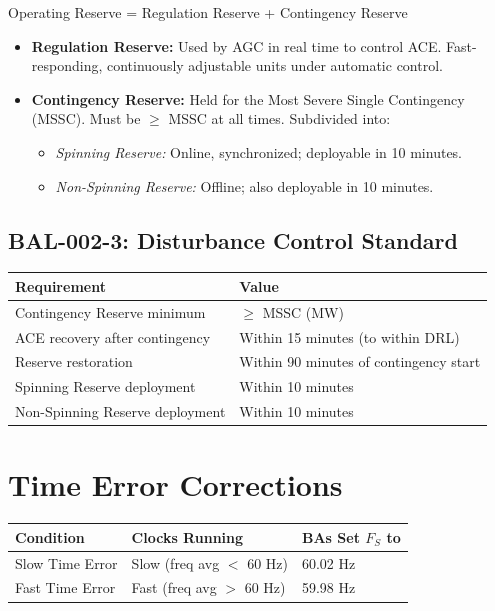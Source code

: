 \documentclass[12pt,twoside,openright]{memoir}
\begin{document}
Operating Reserve = Regulation Reserve + Contingency Reserve

\begin{itemize}
  \item \textbf{Regulation Reserve:} Used by AGC in real time to control ACE. Fast-responding,
        continuously adjustable units under automatic control.
  \item \textbf{Contingency Reserve:} Held for the Most Severe Single Contingency (MSSC).
        Must be $\geq$ MSSC at all times. Subdivided into:
        \begin{itemize}
          \item \textit{Spinning Reserve:} Online, synchronized; deployable in 10 minutes.
          \item \textit{Non-Spinning Reserve:} Offline; also deployable in 10 minutes.
        \end{itemize}
\end{itemize}

\subsection{BAL-002-3: Disturbance Control Standard}

\begin{center}
\begin{tabular}{@{}ll@{}}
\toprule
\rowcolor{nercblue!15}
\textbf{Requirement} & \textbf{Value} \\
\midrule
Contingency Reserve minimum & $\geq$ MSSC (MW) \\
\rowcolor{rowlight}
ACE recovery after contingency & Within 15 minutes (to within DRL) \\
Reserve restoration & Within 90 minutes of contingency start \\
\rowcolor{rowlight}
Spinning Reserve deployment & Within 10 minutes \\
Non-Spinning Reserve deployment & Within 10 minutes \\
\bottomrule
\end{tabular}
\end{center}

\section{Time Error Corrections}

\begin{center}
\begin{tabular}{@{}lll@{}}
\toprule
\rowcolor{nercblue!15}
\textbf{Condition} & \textbf{Clocks Running} & \textbf{BAs Set $F_S$ to} \\
\midrule
Slow Time Error & Slow (freq avg $<$ 60 Hz) & 60.02 Hz \\
\rowcolor{rowlight}
Fast Time Error & Fast (freq avg $>$ 60 Hz) & 59.98 Hz \\
\bottomrule
\end{tabular}
\end{center}
\end{document}
